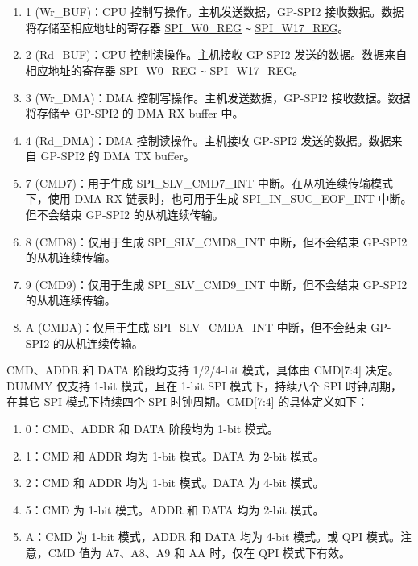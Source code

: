 \documentclass[main\_\_CN.tex]{subfiles}
\begin{document}
\begin{enumerate}
    \item \hexprefix{}1 (Wr\_BUF)：CPU 控制写操作。主机发送数据，GP-SPI2 接收数据。数据将存储至相应地址的寄存器 \hyperref[regdesc:SPIW0REG]{SPI\_W0\_REG} \verb+~+ \hyperref[regdesc:SPIW17REG]{SPI\_W17\_REG}。

    \item \hexprefix{}2 (Rd\_BUF)：CPU 控制读操作。主机接收 GP-SPI2 发送的数据。数据来自相应地址的寄存器 \hyperref[regdesc:SPIW0REG]{SPI\_W0\_REG} \verb+~+ \hyperref[regdesc:SPIW17REG]{SPI\_W17\_REG}。

    \item \hexprefix{}3 (Wr\_DMA)：DMA 控制写操作。主机发送数据，GP-SPI2 接收数据。数据将存储至 GP-SPI2 的 DMA RX buffer 中。

    \item \hexprefix{}4 (Rd\_DMA)：DMA 控制读操作。主机接收 GP-SPI2 发送的数据。数据来自 GP-SPI2 的 DMA TX buffer。

    \item \hexprefix{}7 (CMD7)：用于生成 SPI\_SLV\_CMD7\_INT 中断。在从机连续传输模式下，使用 DMA RX 链表时，也可用于生成 SPI\_IN\_SUC\_EOF\_INT 中断。但不会结束 GP-SPI2 的从机连续传输。

    \item \hexprefix{}8 (CMD8)：仅用于生成 SPI\_SLV\_CMD8\_INT 中断，但不会结束 GP-SPI2 的从机连续传输。

    \item \hexprefix{}9 (CMD9)：仅用于生成 SPI\_SLV\_CMD9\_INT 中断，但不会结束 GP-SPI2 的从机连续传输。

    \item \hexprefix{}A (CMDA)：仅用于生成 SPI\_SLV\_CMDA\_INT 中断，但不会结束 GP-SPI2 的从机连续传输。

\end{enumerate}

CMD、ADDR 和 DATA 阶段均支持 1/2/4-bit 模式，具体由 CMD[7:4] 决定。DUMMY 仅支持 1-bit 模式，且在 1-bit SPI 模式下，持续八个 SPI 时钟周期，在其它 SPI 模式下持续四个 SPI 时钟周期。CMD[7:4] 的具体定义如下：

\begin{enumerate}
    \item \hexprefix{}0：CMD、ADDR 和 DATA 阶段均为 1-bit 模式。
    \item \hexprefix{}1：CMD 和 ADDR 均为 1-bit 模式。DATA 为 2-bit 模式。
    \item \hexprefix{}2：CMD 和 ADDR 均为 1-bit 模式。DATA 为 4-bit 模式。
    \item \hexprefix{}5：CMD 为 1-bit 模式。ADDR 和 DATA 均为 2-bit 模式。
    \item \hexprefix{}A：CMD 为 1-bit 模式，ADDR 和 DATA 均为 4-bit 模式。或 QPI 模式。注意，CMD 值为 \hexprefix{}A7、\hexprefix{}A8、\hexprefix{}A9 和 \hexprefix{}AA 时，仅在 QPI 模式下有效。
\end{enumerate}
\end{document}

